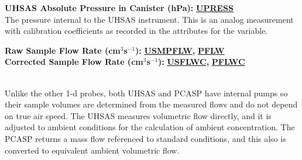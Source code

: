 \begin{hangparagraphs}
\textbf{UHSAS Absolute Pressure in Canister (hPa):}\textbf{
}\textbf{\uline{UPRESS}}\\
The pressure internal to the UHSAS instrument. This is an analog measurement
with calibration coefficients as recorded in the attributes for the
variable.\label{punch:7-2}

\noindent\begin{minipage}[t]{1\columnwidth}%
\textbf{Raw Sample Flow Rate (cm$^{3}$s$^{-1}$):}\textbf{
}\textbf{\uline{USMPFLW}}\textbf{, }\textbf{\uline{PFLW}}\\
\textbf{Corrected Sample Flow Rate (cm$^{3}$s$^{-1}$):}\textbf{
}\textbf{\uline{USFLWC}}\textbf{, }\textbf{\uline{PFLWC}}%
\end{minipage}\\
Unlike the other 1-d probes, both UHSAS and PCASP have internal pumps
so their sample volumes are determined from the measured flows and
do not depend on true air speed. The UHSAS measures volumetric flow
directly, and it is adjusted to ambient conditions for the calculation
of ambient concentration. The PCASP returns a mass
flow referenced to standard conditions, and this also is converted
to equivalent ambient volumetric flow.\\
\\
\end{hangparagraphs}

